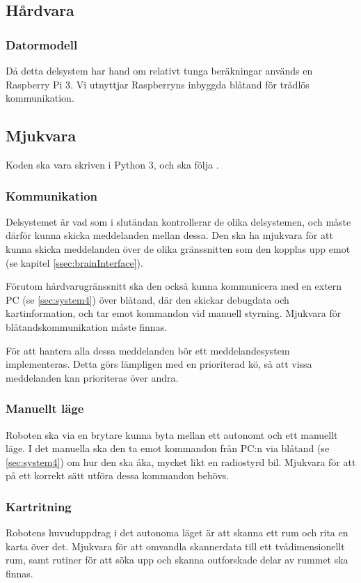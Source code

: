 \documentclass[a4paper,11pt]{article}
\begin{document}
\subsection{Hårdvara}

\subsubsection{Datormodell}
Då detta delsystem har hand om relativt tunga beräkningar används en Raspberry Pi 3. Vi utnyttjar Raspberryns inbyggda blåtand för trådlös kommunikation.

\subsection{Mjukvara}
Koden ska vara skriven i Python 3, och ska följa \cite{pep8}.

\subsubsection{Kommunikation}
Delsystemet är vad som i slutändan kontrollerar de olika delsystemen, och måste därför kunna skicka meddelanden mellan dessa. Den ska ha mjukvara för att kunna skicka meddelanden över de olika gränssnitten som den kopplas upp emot (se kapitel \ref{ssec:brainInterface}).

Förutom hårdvarugränssnitt ska den också kunna kommunicera med en extern PC (se \ref{sec:system4}) över blåtand, där den skickar debugdata och kartinformation, och tar emot kommandon vid manuell styrning. Mjukvara för blåtandskommunikation måste finnas.

För att hantera alla dessa meddelanden bör ett meddelandesystem implementeras. Detta görs lämpligen med en prioriterad kö, så att vissa meddelanden kan prioriteras över andra.

\subsubsection{Manuellt läge}
Roboten ska via en brytare kunna byta mellan ett autonomt och ett manuellt läge. I det manuella ska den ta emot kommandon från PC:n via blåtand (se \ref{sec:system4}) om hur den ska åka, mycket likt en radiostyrd bil. Mjukvara för att på ett korrekt sätt utföra dessa kommandon behövs.

\subsubsection{Kartritning}
Robotens huvuduppdrag i det autonoma läget är att skanna ett rum och rita en karta över det. Mjukvara för att omvandla skannerdata till ett tvådimensionellt rum, samt rutiner för att söka upp och skanna outforskade delar av rummet ska finnas.
\end{document}
